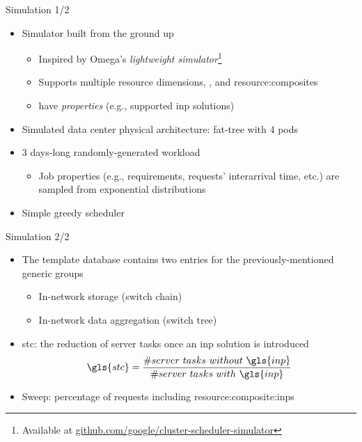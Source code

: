 \begin{frame}{Simulation 1/2}
    \begin{itemize}
        \item Simulator built from the ground up %
        \begin{itemize}
            \item Inspired by Omega's \cite{omega} \textit{lightweight simulator}\footnote[2]{\scriptsize{Available at \href{https://github.com/google/cluster-scheduler-simulator}{github.com/google/cluster-scheduler-simulator}}}
            \item Supports multiple resource dimensions, , and \glspl{resource:composite}
            \item {} have \textit{properties} (e.g., supported \gls{inp} solutions) %
        \end{itemize}
        \item Simulated data center physical architecture: fat-tree with 4 pods
        \item 3 days-long randomly-generated workload
        \begin{itemize}
            \item Job properties (e.g., requirements, requests' interarrival time, etc.) are sampled from exponential distributions %
        \end{itemize}
        \item Simple greedy scheduler
    \end{itemize}
\end{frame}

\begin{frame}{Simulation 2/2}
    \begin{itemize}
        \item The template database contains two entries for the previously-mentioned generic groups
        \begin{itemize}
            \item In-network storage (switch chain)
            \item In-network data aggregation (switch tree)
        \end{itemize}
        \item \gls{stc}: the reduction of server tasks once an \gls{inp} solution is introduced
        \begin{equation}
        \label{stc_formula}
        \gls{stc}=\dfrac{\#server\ tasks\ without\ \gls{inp}}{\#server\ tasks\ with\ \gls{inp}}
        \end{equation}
        \item Sweep: percentage of requests including \glspl{resource:composite:inp}
    \end{itemize}
\end{frame}

